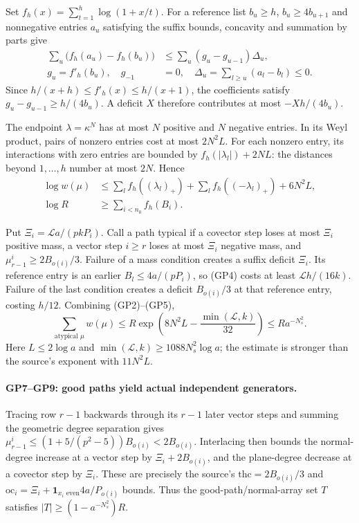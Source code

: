 \documentclass[11pt,a4paper]{article}
\numberwithin{equation}{section}
\theoremstyle{remark}\newtheorem{remark}[theorem]{Remark}
\begin{document}
Set $f_h(x)=\sum_{t=1}^h\log(1+x/t)$.  For a reference list
$b_u\geq h$, $b_u\geq4b_{u+1}$ and nonnegative entries $a_u$ satisfying the
suffix bounds, concavity and summation by parts give
\[
 \begin{split}
 \sum_u\bigl(f_h(a_u)-f_h(b_u)\bigr)
 &\leq\sum_u(g_u-g_{u-1})\Delta_u,\\
 g_u=f'_h(b_u),\quad g_{-1}&=0,\quad
 \Delta_u=\sum_{l\geq u}(a_l-b_l)\leq0.
 \end{split}
 \tag{GP4}
\]
Since $h/(x+h)\leq f'_h(x)\leq h/(x+1)$, the coefficients satisfy
$g_u-g_{u-1}\geq h/(4b_u)$.  A deficit $X$ therefore contributes
at most $-Xh/(4b_u)$.

The endpoint $\lambda=\kappa^N$ has at most $N$ positive and $N$
negative entries.  In its Weyl product, pairs of nonzero entries cost
at most $2N^2L$.  For each nonzero entry, its interactions with zero
entries are bounded by $f_h(|\lambda_l|)+2NL$: the distances beyond
$1,\ldots,h$ number at most $2N$.  Hence
\[
 \begin{aligned}
 \log w(\mu)&\leq
 \sum_l f_h((\lambda_l)_+)+\sum_l f_h((-\lambda_l)_+)+6N^2L,\\
 \log R&\geq\sum_{i<n_0}f_h(B_i).
 \end{aligned}
 \tag{GP5}
\]

Put $\Xi_i=\mathcal L a/(pkP_i)$.  Call a path typical if a covector
step loses at most $\Xi_i$ positive mass, a vector step $i\geq r$
loses at most $\Xi_i$ negative mass, and
$\mu^i_{r-1}\geq2B_{o(i)}/3$.  Failure of a mass condition creates
a suffix deficit $\Xi_i$.  Its reference entry is an earlier
$B_l\leq4a/(pP_i)$, so (GP4) costs at least $\mathcal L h/(16k)$.
Failure of the last condition creates a deficit $B_{o(i)}/3$ at that
reference entry, costing $h/12$.  Combining (GP2)--(GP5),
\[
 \sum_{\text{atypical }\mu}w(\mu)
 \leq R\exp\!\left(8N^2L-\frac{\min(\mathcal L,k)}{32}\right)
 \leq R a^{-N_s^2}.
 \tag{GP6}
\]
Here $L\leq2\log a$ and
$\min(\mathcal L,k)\geq1088N_s^2\log a$; the estimate is stronger
than the source's exponent with $11N^2L$.

\paragraph{GP7--GP9: good paths yield actual independent generators.}
Tracing row $r-1$ backwards through its $r-1$ later vector steps and
summing the geometric degree separation gives
$\mu^i_{r-1}\leq(1+5/(p^2-5))B_{o(i)}<2B_{o(i)}$.
Interlacing then bounds the normal-degree increase at a vector step
by $\Xi_i+2B_{o(i)}$, and the plane-degree decrease at a covector
step by $\Xi_i$.  These are precisely the source's
$\mathrm{thc}=2B_{o(i)}/3$ and
$\mathrm{oc}_i=\Xi_i+\mathbf1_{x_i\text{ even}}4a/P_{o(i)}$
bounds.  Thus the good-path/normal-array set $T$ satisfies
$|T|\geq(1-a^{-N_s^2})R$.
\end{document}
